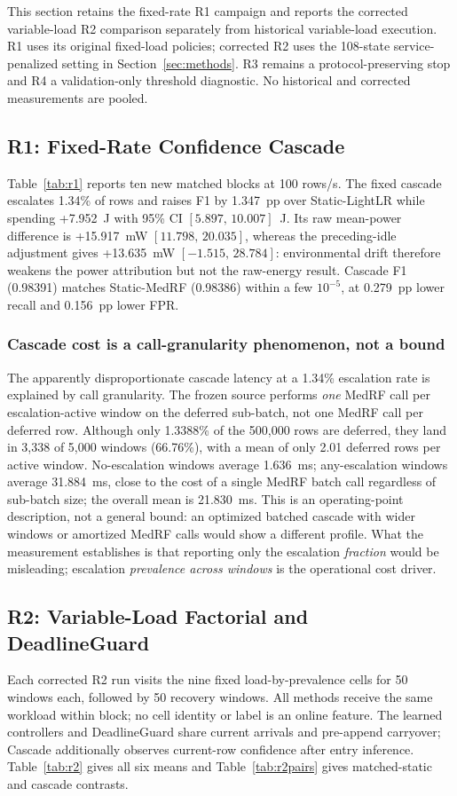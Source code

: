 This section retains the fixed-rate R1 campaign and reports the corrected variable-load R2 comparison separately from historical variable-load execution. R1 uses its original fixed-load policies; corrected R2 uses the 108-state service-penalized setting in Section~\ref{sec:methods}. R3 remains a protocol-preserving stop and R4 a validation-only threshold diagnostic. No historical and corrected measurements are pooled.

\subsection{R1: Fixed-Rate Confidence Cascade}
Table~\ref{tab:r1} reports ten new matched blocks at 100 rows/s. The fixed cascade escalates 1.34\% of rows and raises F1 by 1.347~pp over Static-LightLR while spending +7.952~J with 95\% CI $[5.897,\,10.007]$~J. Its raw mean-power difference is +15.917~mW $[11.798,\,20.035]$, whereas the preceding-idle adjustment gives +13.635~mW $[-1.515,\,28.784]$: environmental drift therefore weakens the power attribution but not the raw-energy result. Cascade F1 (0.98391) matches Static-MedRF (0.98386) within a few $10^{-5}$, at 0.279~pp lower recall and 0.156~pp lower FPR.

\subsubsection*{Cascade cost is a call-granularity phenomenon, not a bound}
The apparently disproportionate cascade latency at a 1.34\% escalation rate is explained by call granularity. The frozen source performs \emph{one} MedRF call per escalation-active window on the deferred sub-batch, not one MedRF call per deferred row. Although only 1.3388\% of the 500{,}000 rows are deferred, they land in 3{,}338 of 5{,}000 windows (66.76\%), with a mean of only 2.01 deferred rows per active window. No-escalation windows average 1.636~ms; any-escalation windows average 31.884~ms, close to the cost of a single MedRF batch call regardless of sub-batch size; the overall mean is 21.830~ms. This is an operating-point description, not a general bound: an optimized batched cascade with wider windows or amortized MedRF calls would show a different profile. What the measurement establishes is that reporting only the escalation \emph{fraction} would be misleading; escalation \emph{prevalence across windows} is the operational cost driver.

\subsection{R2: Variable-Load Factorial and DeadlineGuard}
Each corrected R2 run visits the nine fixed load-by-prevalence cells for 50 windows each, followed by 50 recovery windows. All methods receive the same workload within block; no cell identity or label is an online feature. The learned controllers and DeadlineGuard share current arrivals and pre-append carryover; Cascade additionally observes current-row confidence after entry inference. Table~\ref{tab:r2} gives all six means and Table~\ref{tab:r2pairs} gives matched-static and cascade contrasts.

